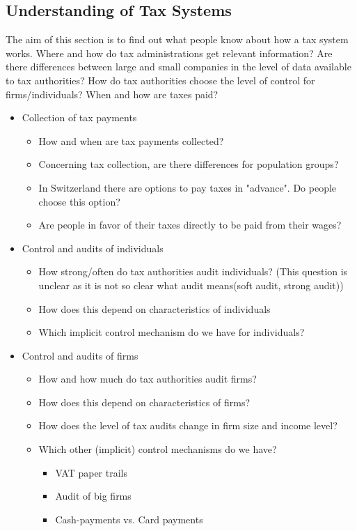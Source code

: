 \documentclass[a4paper, 12pt]{article}
\begin{document}
\subsection{Understanding of Tax Systems}
The aim of this section is to find out what people know about how a tax system works. Where and how do tax administrations get relevant information? Are there differences between large and small companies in the level of data available to tax authorities? How do tax authorities choose the level of control for firms/individuals? When and how are taxes paid?  
\begin{itemize}
    \item Collection of tax payments
    \begin{itemize}
        \item How and when are tax payments collected? 
        \item Concerning tax collection, are there differences for population groups?
        \item In Switzerland there are options to pay taxes in "advance". Do people choose this option?
        \item Are people in favor of their taxes directly to be paid from their wages?
    \end{itemize}
    \item Control and audits of individuals 
    \begin{itemize}
        \item How strong/often do tax authorities audit individuals? (This question is unclear as it is not so clear what audit means(soft audit, strong audit))
        \item How does this depend on characteristics of individuals 
        \item Which implicit control mechanism do we have for individuals? 
    \end{itemize}
    \item Control and audits of firms
    \begin{itemize}
        \item How and how much do tax authorities audit firms?
    \end{itemize}
    \begin{itemize}
        \item How does this depend on characteristics of firms? 
    \end{itemize}
    \begin{itemize}
        \item How does the level of tax audits change in firm size and income level?
    \end{itemize}
    \begin{itemize}
        \item Which other (implicit) control mechanisms do we have?
    \begin{itemize}
            \item VAT paper trails
            \item Audit of big firms
            \item Cash-payments vs. Card payments
    \end{itemize}
    \end{itemize}
\end{itemize}
\end{document}
